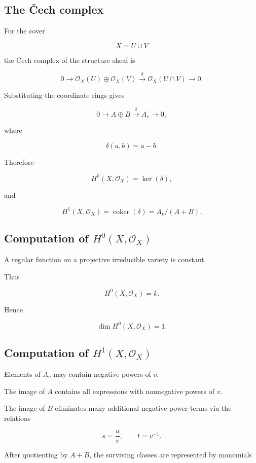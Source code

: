 \documentclass[12pt,a4paper]{article}
\theoremstyle{notespace}
\begin{document}
\subsection{The Čech complex}

For the cover

\[
X=U\cup V
\]

the Čech complex of the structure sheaf is

\[
0
\longrightarrow
\mathcal O_X(U)\oplus \mathcal O_X(V)
\overset{\delta}{\longrightarrow}
\mathcal O_X(U\cap V)
\longrightarrow 0.
\]

Substituting the coordinate rings gives

\[
0
\longrightarrow
A\oplus B
\overset{\delta}{\longrightarrow}
A_v
\longrightarrow 0,
\]

where

\[
\delta(a,b)=a-b.
\]

Therefore

\[
H^0(X,\mathcal O_X)
=
\ker(\delta),
\]

and

\[
H^1(X,\mathcal O_X)
=
\operatorname{coker}(\delta)
=
A_v/(A+B).
\]

\subsection{Computation of \(H^0(X,\mathcal O_X)\)}

A regular function on a projective irreducible variety is constant.

Thus

\[
H^0(X,\mathcal O_X)=k.
\]

Hence

\[
\boxed{
	\dim H^0(X,\mathcal O_X)=1.
}
\]

\subsection{Computation of \(H^1(X,\mathcal O_X)\)}

Elements of \(A_v\) may contain negative powers of \(v\).

The image of \(A\) contains all expressions with nonnegative powers of \(v\).

The image of \(B\) eliminates many additional negative-power terms via the relations

\[
s=\frac{u}{v},
\qquad
t=v^{-1}.
\]

After quotienting by \(A+B\), the surviving classes are represented by monomials
\end{document}
